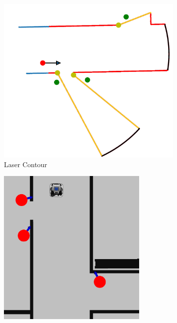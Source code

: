 \begin{figure}[h!]
    \centering
    \begin{subfigure}[t]{0.45\columnwidth}
    \centering
  \includegraphics[width=\columnwidth]{images/chapter5/detection.png}
  \caption{Laser Contour}
\end{subfigure}
\begin{subfigure}[t]{0.45\columnwidth}
\centering
  \includegraphics[width=0.8\textwidth]{images/chapter5/detection_rviz.png} 

\end{subfigure}
\end{figure}
